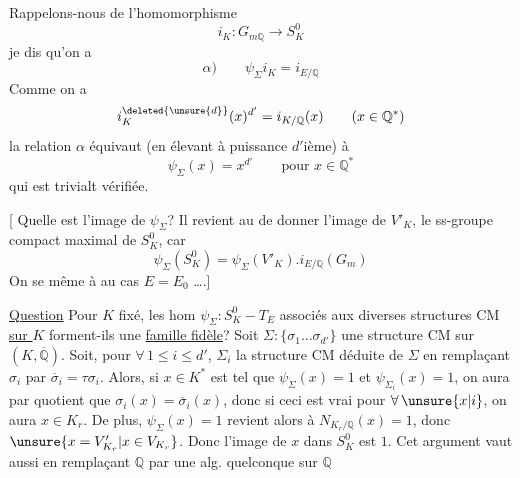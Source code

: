 Rappelons-nous de l'homomorphisme
\[
i_K:G_{m\mathbb Q}\longrightarrow S_K^0
\]
je dis qu'on a
\[
\alpha)\qquad\boxed{\psi_\Sigma i_K=i_{E/\mathbb Q}}
\]
Comme on a
\[
i_K^{\deleted{\unsure{d}}}(x)^{d'}=i_{K/\mathbb Q}(x)\qquad(x\in\mathbb Q^*)
\]
la relation $\alpha$ équivaut (en élevant à puissance $d'$ième) à
\[
\psi_\Sigma(x)=x^{d'}\qquad\text{pour }x\in\mathbb Q^*
\]
qui est trivialt vérifiée.

[ Quelle est l'image de $\psi_\Sigma$? Il revient au  de
donner l'image de $V'_K$, le ss-groupe compact maximal de $S_K^0$, car
\[
\psi_\Sigma(S_K^0)=\psi_\Sigma(V'_K).i_{E/\mathbb Q}(G_m)
\]
On se  même à   au cas
$E=E_0$ \ldots.]

\uline{Question} Pour $K$ fixé,  les hom $\psi_\Sigma:S_K^0-T_E$ associés aux diverses
structures CM \uline{sur $K$}  forment-ils une \uline{famille fidèle}?
Soit $\Sigma:\{\sigma_1\ldots\sigma_{d'}\}$ une structure CM sur $(K,\overline{\mathbb Q})$.
 Soit, pour $\forall\,1\leq i\leq d'$,
$\Sigma_i$  la structure CM déduite de $\Sigma$ en remplaçant
$\sigma_i$ par $\overline\sigma_i=\tau\sigma_i$. Alors, si $x\in K^*$ est tel que
$\psi_\Sigma(x)=1$ et $\psi_{\Sigma_i}(x)=1$, on aura par quotient que
$\sigma_i(x)=\overline\sigma_i(x)$, donc si ceci est vrai pour $\forall\,\unsure{x|i}$,
on aura $x\in K_r$. De plus,  $\psi_\Sigma(x)=1$ revient alors à
$N_{K_r/\mathbb Q}(x)=1$, donc $\unsure{x=V'_{K_r}|x\in V_{K_r}}$.
Donc l'image de $x$ dans $S_K^0$ est $1$.
Cet argument vaut aussi en remplaçant $\mathbb Q$ par une alg. quelconque sur $\mathbb Q$
\deleted{[car $\unsure{\bigcap\operatorname{Ker}(\sigma_i,\overline\sigma_i)\subset K_r}$ est
\unsure{stable} par}
